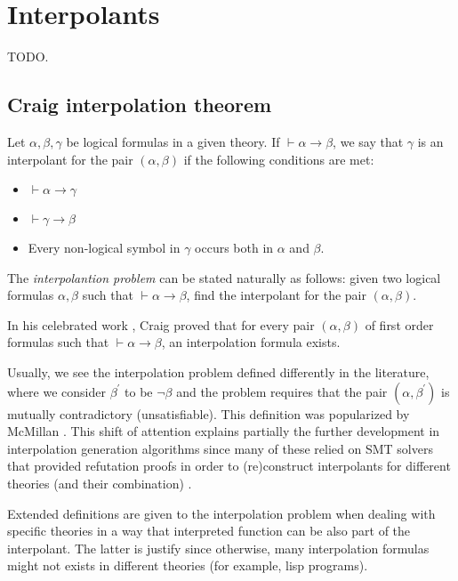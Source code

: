 \section{Interpolants}


TODO.

\subsection{Craig interpolation theorem}


Let $\alpha, \beta, \gamma$ be logical formulas in a given theory. If
$\vdash \alpha \rightarrow \beta$, we say that $\gamma$ is an
interpolant for the pair $(\alpha, \beta)$ if the following conditions
are met:

\begin{itemize}
\item $\vdash \alpha \rightarrow \gamma$
\item $\vdash \gamma \rightarrow \beta$
\item Every non-logical symbol in $\gamma$ occurs both in $\alpha$ and
  $\beta$.
\end{itemize}

The \emph{interpolantion problem} can be stated naturally as follows: given two
logical formulas $\alpha, \beta$ such that $\vdash \alpha \rightarrow \beta$, find
the interpolant for the pair $(\alpha, \beta)$.

In his celebrated work \cite{10.2307/2963594}, Craig proved that for every pair
$(\alpha, \beta)$ of first order formulas such that
$\vdash \alpha \rightarrow \beta$, an interpolation formula exists.

Usually, we see the interpolation problem defined differently in the literature, where
we consider $\beta^{'}$ to be $\neg \beta$ and the problem requires that the pair $(\alpha, \beta^{'})$
is mutually contradictory (unsatisfiable). This definition was popularized by McMillan
\cite{10.1007/978-3-540-24730-2_2}. This shift of attention explains partially the further
development in interpolation generation algorithms since many of these relied on
SMT solvers that provided refutation proofs in order to (re)construct interpolants
for different theories (and their combination) \cite{10.1007/978-3-642-02959-2_17,
  10.1007/978-3-642-36742-7_9, mcmillan2011interpolants}.

Extended definitions are given to the interpolation problem when dealing with specific
theories \cite{10.1007/11532231_26} in a way that interpreted function can be also part of
the interpolant. The latter is justify since otherwise, many interpolation formulas might
not exists in different theories (for example, lisp programs).

